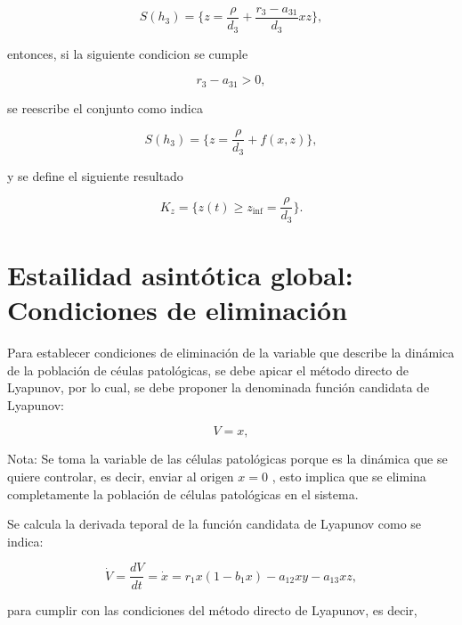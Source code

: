 \documentclass[letterpaper,11pt]{article}
\begin{document}
\begin{equation*}
S(h_{3})=\{z=\frac{\rho }{d_{3}}+\frac{r_{3}-a_{31}}{d_{3}}xz\},
\end{equation*}

entonces, si la siguiente condicion se cumple

\begin{equation*}
r_{3}-a_{31}>0,
\end{equation*}

se reescribe el conjunto como indica

\begin{equation*}
S(h_{3})=\{z=\frac{\rho }{d_{3}}+f(x,z)\},
\end{equation*}

y se define el siguiente resultado

\begin{equation*}
K_{z}=\{z(t)\geq z_{\inf }=\frac{\rho }{d_{3}}\}.
\end{equation*}

\bigskip

\section{Estailidad asint\'{o}tica global: Condiciones de eliminaci\'{o}n}

\qquad Para establecer condiciones de eliminaci\'{o}n de la variable que
describe la din\'{a}mica de la poblaci\'{o}n de c\'{e}ulas patol\'{o}gicas,
se debe apicar el m\'{e}todo directo de Lyapunov, por lo cual, se debe
proponer la denominada funci\'{o}n candidata de Lyapunov:

\begin{equation*}
V=x,
\end{equation*}

\qquad Nota: Se toma la variable de las c\'{e}lulas patol\'{o}gicas porque
es la din\'{a}mica que se quiere controlar, es decir, enviar al origen $x=0$%
, esto implica que se elimina completamente la poblaci\'{o}n de c\'{e}lulas
patol\'{o}gicas en el sistema.

\qquad Se calcula la derivada teporal de la funci\'{o}n candidata de
Lyapunov como se indica:

\begin{equation*}
\dot{V}=\frac{dV}{dt}=\dot{x}=r_{1}x(1-b_{1}x)-a_{12}xy-a_{13}xz,
\end{equation*}

para cumplir con las condiciones del m\'{e}todo directo de Lyapunov, es
decir,
\end{document}
